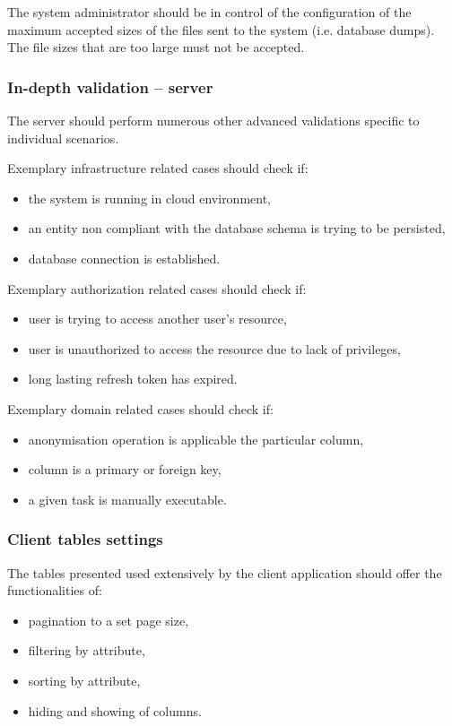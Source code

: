 \documentclass[a4paper,twoside,12pt]{book}
\begin{document}
The system administrator should be in control of the configuration of the maximum accepted sizes of the files sent to the system (i.e. database dumps). The file sizes that are too large must not be accepted.

\subsubsection{In-depth validation – server}

The server should perform numerous other advanced validations specific to individual scenarios.

Exemplary infrastructure related cases should check if:
\begin{itemize}
\item the system is running in cloud environment,
\item an entity non compliant with the database schema is trying to be persisted,
\item database connection is established.
\end{itemize}

Exemplary authorization related cases should check if:
\begin{itemize}
\item user is trying to access another user's resource,
\item user is unauthorized to access the resource due to lack of privileges,
\item long lasting refresh token has expired.
\end{itemize}

Exemplary domain related cases should check if:
\begin{itemize}
\item anonymisation operation is applicable the particular column,
\item column is a primary or foreign key,
\item a given task is manually executable.
\end{itemize}

\subsubsection{Client tables settings}
The tables presented used extensively by the client application should offer the functionalities of:

\begin{itemize}
\item pagination to a set page size,
\item filtering by attribute,
\item sorting by attribute,
\item hiding and showing of columns.
\end{itemize}
\end{document}
